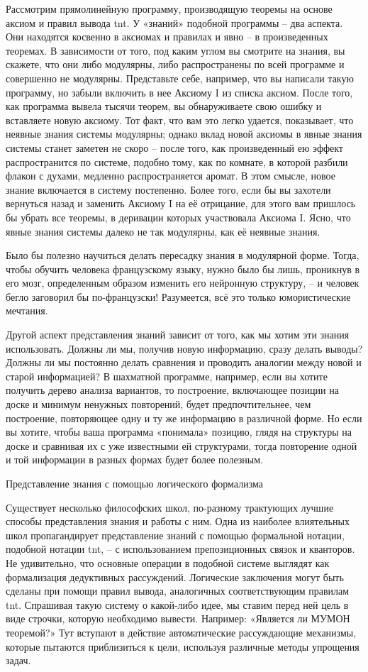 \documentclass[../main.tex]{subfiles}
\begin{document}
Рассмотрим прямолинейную программу, производящую теоремы на основе аксиом и правил вывода \acs{tnt}\@. У «знаний» подобной программы \--- два аспекта. Они находятся косвенно в аксиомах и правилах и явно \--- в произведенных теоремах. В зависимости от того, под каким углом вы смотрите на знания, вы скажете, что они либо модулярны, либо распространены по всей программе и совершенно не модулярны. Представьте себе, например, что вы написали такую программу, но забыли включить в нее Аксиому I из списка аксиом. После того, как программа вывела тысячи теорем, вы обнаруживаете свою ошибку и вставляете новую аксиому. Тот факт, что вам это легко удается, показывает, что неявные знания системы модулярны; однако вклад новой аксиомы в явные знания системы станет заметен не скоро \--- после того, как произведенный ею эффект распространится по системе, подобно тому, как по комнате, в которой разбили флакон с духами, медленно распространяется аромат. В этом смысле, новое знание включается в систему постепенно. Более того, если бы вы захотели вернуться назад и заменить Аксиому I на её отрицание, для этого вам пришлось бы убрать все теоремы, в деривации которых участвовала Аксиома I. Ясно, что явные знания системы далеко не так модулярны, как её неявные знания.

Было бы полезно научиться делать пересадку знания в модулярной форме. Тогда, чтобы обучить человека французскому языку, нужно было бы лишь, проникнув в его мозг, определенным образом изменить его нейронную структуру, \--- и человек бегло заговорил бы по-французски! Разумеется, всё это только юмористические мечтания.

Другой аспект представления знаний зависит от того, как мы хотим эти знания использовать. Должны ли мы, получив новую информацию, сразу делать выводы? Должны ли мы постоянно делать сравнения и проводить аналогии между новой и старой информацией? В шахматной программе, например, если вы хотите получить дерево анализа вариантов, то построение, включающее позиции на доске и минимум ненужных повторений, будет предпочтительнее, чем построение, повторяющее одну и ту же информацию в различной форме. Но если вы хотите, чтобы ваша программа «понимала» позицию, глядя на структуры на доске и сравнивая их с уже известными ей структурами, тогда повторение одной и той информации в разных формах будет более полезным.

Представление знания с помощью логического формализма

Существует несколько философских школ, по-разному трактующих лучшие способы представления знания и работы с ним. Одна из наиболее влиятельных школ пропагандирует представление знаний с помощью формальной нотации, подобной нотации \acs{tnt}, \--- с использованием препозиционных связок и кванторов. Не удивительно, что основные операции в подобной системе выглядят как формализация дедуктивных рассуждений. Логические заключения могут быть сделаны при помощи правил вывода, аналогичных соответствующим правилам \acs{tnt}\@. Спрашивая такую систему о какой-либо идее, мы ставим перед ней цель в виде строчки, которую необходимо вывести. Например: «Является ли МУМОН теоремой?» Тут вступают в действие автоматические рассуждающие механизмы, которые пытаются приблизиться к цели, используя различные методы упрощения задач.
\end{document}
